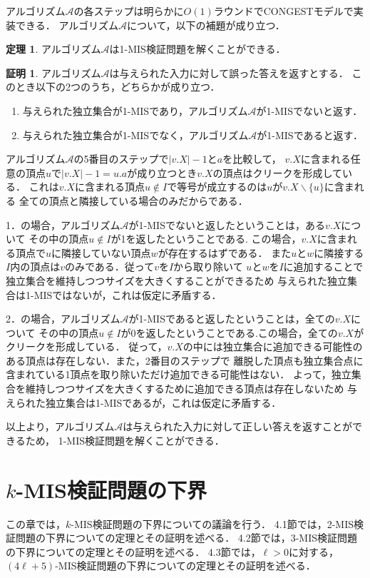 \documentclass[12pt]{thesis}
\newcommand{\CONGEST}{\textsf{CONGEST}}
\theoremstyle{definition}
\newtheorem{theorem}{定理}[chapter]
\newtheorem*{prf*}{証明}
\begin{document}
アルゴリズム$\mathcal{A}$の各ステップは明らかに$O(1)$ラウンドで{\CONGEST}モデルで実装できる．
アルゴリズム$\mathcal{A}$について，以下の補題が成り立つ．
\begin{theorem}
アルゴリズム$\mathcal{A}$は1-MIS検証問題を解くことができる．
\end{theorem}
\begin{prf*}
アルゴリズム$\mathcal{A}$は与えられた入力に対して誤った答えを返すとする．
このとき以下の2つのうち，どちらかが成り立つ． 
\begin{enumerate}
\item 与えられた独立集合が1-MISであり，アルゴリズム$\mathcal{A}$が1-MISでないと返す． 
\item 与えられた独立集合が1-MISでなく，アルゴリズム$\mathcal{A}$が1-MISであると返す． 
\end{enumerate}
アルゴリズム$\mathcal{A}$の5番目のステップで$|v.X| - 1$と$a$を比較して，
$v.X$に含まれる任意の頂点$u$で$|v.X| - 1 = u.a$が成り立つとき$v.X$の頂点はクリークを形成している．
これは$v.X$に含まれる頂点$u \notin I$で等号が成立するのは$u$が$v.X \backslash \{u\}$に含まれる
全ての頂点と隣接している場合のみだからである．

1．の場合，アルゴリズム$\mathcal{A}$が1-MISでないと返したということは，ある$v.X$について
その中の頂点$u \notin I$が1を返したということである.
この場合，$v.X$に含まれる頂点で$u$に隣接していない頂点$w$が存在するはずである．
また$u$と$w$に隣接する$I$内の頂点は$v$のみである．従って$v$を$I$から取り除いて
$u$と$w$を$I$に追加することで独立集合を維持しつつサイズを大きくすることができるため
与えられた独立集合は1-MISではないが，これは仮定に矛盾する． 

2．の場合，アルゴリズム$\mathcal{A}$が1-MISであると返したということは，全ての$v.X$について
その中の頂点$u \notin I$が0を返したということである.この場合，全ての$v.X$がクリークを形成している．
従って，$v.X$の中には独立集合に追加できる可能性のある頂点は存在しない．また，2番目のステップで
離脱した頂点も独立集合点に含まれている1頂点を取り除いただけ追加できる可能性はない．
よって，独立集合を維持しつつサイズを大きくするために追加できる頂点は存在しないため
与えられた独立集合は1-MISであるが，これは仮定に矛盾する． 

以上より，アルゴリズム$\mathcal{A}$は与えられた入力に対して正しい答えを返すことができるため，
1-MIS検証問題を解くことができる．
\end{prf*}
\newpage

\chapter{$k$-MIS検証問題の下界}
この章では，$k$-MIS検証問題の下界についての議論を行う．
4.1節では，2-MIS検証問題の下界についての定理とその証明を述べる．
4.2節では，3-MIS検証問題の下界についての定理とその証明を述べる．
4.3節では，$\ell > 0$に対する，$(4\ell + 5)$-MIS検証問題の下界についての定理とその証明を述べる．
\end{document}
